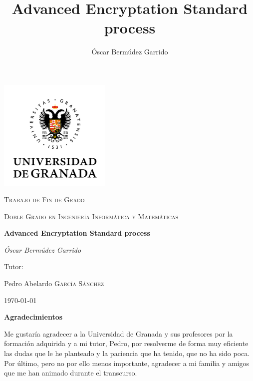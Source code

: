 \documentclass[a4paper,12pt]{report}
\title{Advanced Encryptation Standard process}
\author{Óscar Bermúdez Garrido}
\date{}
\theoremstyle{definition}
\begin{document}

\begin{titlepage}
  \centering
  \includegraphics[width=0.4\textwidth]{Images/logo_UGR.png}
  \par\vspace{0.5cm}
  {\scshape\Large Trabajo de Fin de Grado \par}
  \vspace{0.5cm}
  {\scshape\large Doble Grado en Ingeniería Informática y Matemáticas\par}
  \vspace{1cm}
  {\Large\bfseries Advanced Encryptation Standard process\par}
  \vspace{0.5cm}
  {\Large\itshape Óscar Bermúdez Garrido\par}
  \vfill
  Tutor:\par
  Pedro Abelardo \textsc{García Sánchez}\par

  \vfill

  {\large \today \par}
\end{titlepage}



\begin{titlepage}
  {\huge \bfseries Agradecimientos}
  \vspace{1cm}

  Me gustaría agradecer a la Universidad de Granada y sus profesores por la formación adquirida y a mi tutor, Pedro, por resolverme de forma muy eficiente las dudas que le he planteado y la paciencia que ha tenido, que no ha sido poca. Por último, pero no por ello menos importante, agradecer a mi familia y amigos que me han animado durante el transcurso.
\end{titlepage}


\tableofcontents
\pagebreak
















%
%
%
\end{document}
